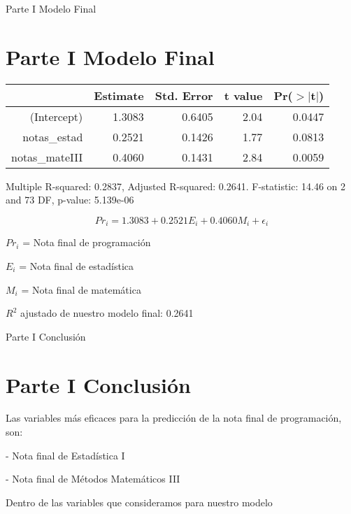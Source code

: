 \documentclass[pdf]{beamer}
\begin{document}
\begin{frame}{Parte I Modelo Final}
\section{Parte I Modelo Final}

\begin{center}
\begin{table}[ht]
\begin{center}
\begin{tabular}{rrrrr}
  \hline
 & Estimate & Std. Error & t value & Pr($>$$|$t$|$) \\ 
  \hline
(Intercept) & 1.3083 & 0.6405 & 2.04 & 0.0447 \\ 
  notas\_estad & 0.2521 & 0.1426 & 1.77 & 0.0813 \\ 
  notas\_mateIII & 0.4060 & 0.1431 & 2.84 & 0.0059 \\ 
   \hline
\end{tabular}
\end{center}
\end{table}

\tiny{Multiple R-squared: 0.2837, Adjusted R-squared: 0.2641.
F-statistic: 14.46 on 2 and 73 DF, p-value: 5.139e-06}
\end{center}

\begin{center}

\[Pr_i = 1.3083 + 0.2521 E_i + 0.4060 M_i + \epsilon_i\]
\end{center}

\(Pr_i\) = Nota final de programación

\(E_i\) = Nota final de estadística

\(M_i\) = Nota final de matemática

\(R^2\) ajustado de nuestro modelo final: 0.2641

\end{frame}
\begin{frame}{Parte I Conclusión}
\section{Parte I Conclusión}
 \begin{footnotesize}
            
            Las variables más eficaces para la predicción de la nota final de programación, son:

            - Nota final de Estadística I
            
            - Nota final de Métodos Matemáticos III

            Dentro de las variables que consideramos para nuestro modelo
            
            

            \end{footnotesize}
            \nocite{comuna}
            \nocite{estrescovid}

\end{frame}
\end{document}
